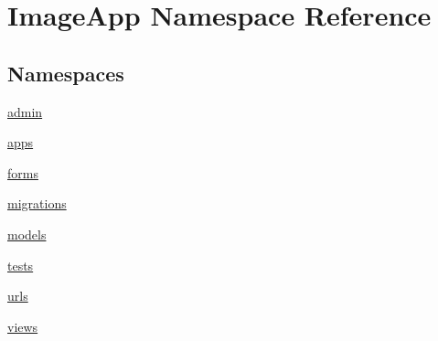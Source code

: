\hypertarget{namespace_image_app}{}\section{Image\+App Namespace Reference}
\label{namespace_image_app}
\subsection*{Namespaces}
\begin{DoxyCompactItemize}
\item 
 \mbox{\hyperlink{namespace_image_app_1_1admin}{admin}}
\item 
 \mbox{\hyperlink{namespace_image_app_1_1apps}{apps}}
\item 
 \mbox{\hyperlink{namespace_image_app_1_1forms}{forms}}
\item 
 \mbox{\hyperlink{namespace_image_app_1_1migrations}{migrations}}
\item 
 \mbox{\hyperlink{namespace_image_app_1_1models}{models}}
\item 
 \mbox{\hyperlink{namespace_image_app_1_1tests}{tests}}
\item 
 \mbox{\hyperlink{namespace_image_app_1_1urls}{urls}}
\item 
 \mbox{\hyperlink{namespace_image_app_1_1views}{views}}
\end{DoxyCompactItemize}
